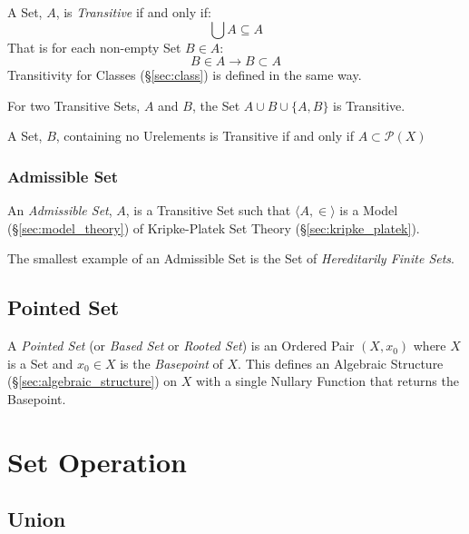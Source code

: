 A Set, $A$, is \emph{Transitive} if and only if:
\[
  \bigcup A \subseteq A
\]
That is for each non-empty Set $B \in A$:
\[
  B \in A \rightarrow B \subset A
\]
Transitivity for Classes (\S\ref{sec:class}) is defined in the same
way.

For two Transitive Sets, $A$ and $B$, the Set $A \cup B \cup \{A,B\}$
is Transitive.

A Set, $B$, containing no Urelements is Transitive if and only if $A
\subset \mathcal{P}(X)$



\subsubsection{Admissible Set}\label{sec:admissible_set}

An \emph{Admissible Set}, $A$, is a Transitive Set such that $\langle
A, \in \rangle$ is a Model (\S\ref{sec:model_theory}) of Kripke-Platek
Set Theory (\S\ref{sec:kripke_platek}).

The smallest example of an Admissible Set is the Set of
\emph{Hereditarily Finite Sets}. %



\subsection{Pointed Set}\label{sec:pointed_set}

A \emph{Pointed Set} (or \emph{Based Set} or \emph{Rooted Set}) is an
Ordered Pair $(X, x_0)$ where $X$ is a Set and $x_0 \in X$ is the
\emph{Basepoint} of $X$. This defines an Algebraic Structure
(\S\ref{sec:algebraic_structure}) on $X$ with a single Nullary
Function that returns the Basepoint.



\section{Set Operation}\label{sec:set_operation}

\subsection{Union}\label{sec:union}

